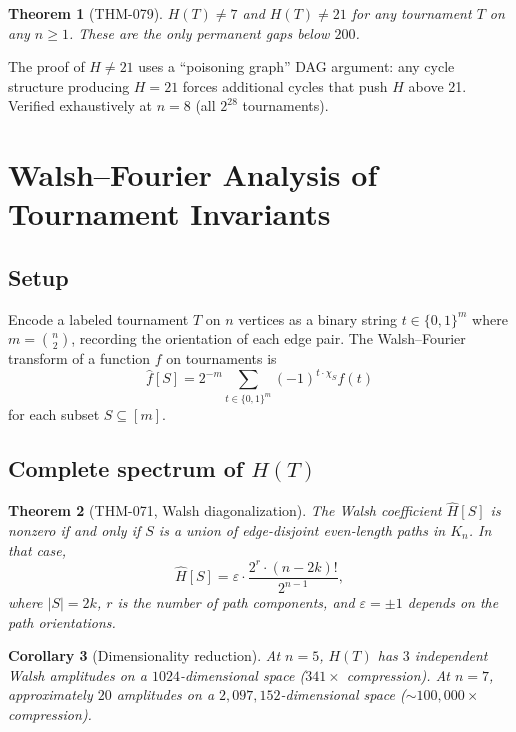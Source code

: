 \documentclass[12pt,reqno]{amsart}
\theoremstyle{plain}
\newtheorem{theorem}{Theorem}[section]
\newtheorem{corollary}[theorem]{Corollary}
\theoremstyle{definition}
\theoremstyle{remark}
\begin{document}
\begin{theorem}[THM-079]\label{thm:hgap}
$H(T) \neq 7$ and $H(T) \neq 21$ for any tournament $T$ on any $n \geq 1$.
These are the only permanent gaps below $200$.
\end{theorem}

The proof of $H \neq 21$ uses a ``poisoning graph'' DAG argument: any
cycle structure producing $H = 21$ forces additional cycles that push $H$
above 21. Verified exhaustively at $n = 8$ (all $2^{28}$ tournaments).

\section{Walsh--Fourier Analysis of Tournament Invariants}\label{sec:walsh}

\subsection{Setup}

Encode a labeled tournament $T$ on $n$ vertices as a binary string
$t \in \{0,1\}^m$ where $m = \binom{n}{2}$, recording the orientation of
each edge pair. The Walsh--Fourier transform of a function $f$ on tournaments is
\[
\hat{f}[S] = 2^{-m} \sum_{t \in \{0,1\}^m} (-1)^{t \cdot \chi_S} f(t)
\]
for each subset $S \subseteq [m]$.

\subsection{Complete spectrum of $H(T)$}

\begin{theorem}[THM-071, Walsh diagonalization]\label{thm:walshH}
The Walsh coefficient $\hat{H}[S]$ is nonzero if and only if $S$ is a union
of edge-disjoint even-length paths in $K_n$. In that case,
\[
\hat{H}[S] = \varepsilon \cdot \frac{2^r \cdot (n - 2k)!}{2^{n-1}},
\]
where $|S| = 2k$, $r$ is the number of path components, and
$\varepsilon = \pm 1$ depends on the path orientations.
\end{theorem}

\begin{corollary}[Dimensionality reduction]
At $n = 5$, $H(T)$ has $3$ independent Walsh amplitudes on a $1024$-dimensional
space ($341\times$ compression). At $n = 7$, approximately $20$ amplitudes on a
$2{,}097{,}152$-dimensional space ($\sim 100{,}000\times$ compression).
\end{corollary}
\end{document}
